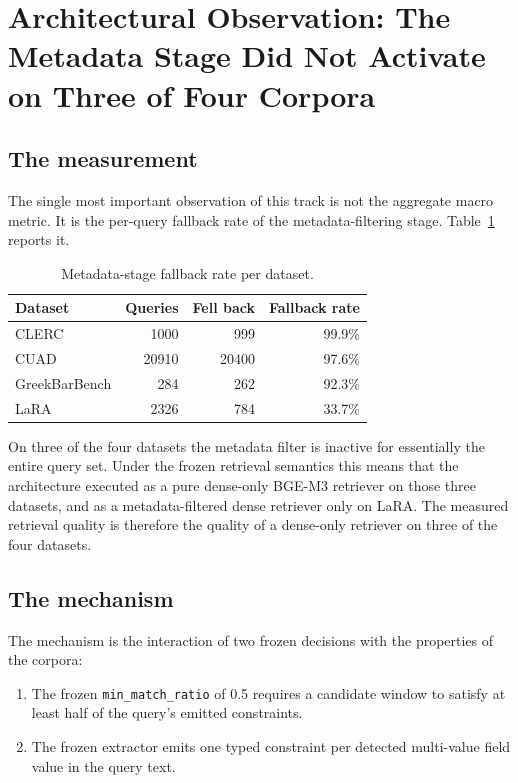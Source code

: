 \documentclass[11pt,a4paper]{article}
\begin{document}
\section{Architectural Observation: The Metadata Stage Did Not
Activate on Three of Four Corpora}\label{sec:observation}

\subsection{The measurement}
The single most important observation of this track is not the
aggregate macro metric. It is the per-query fallback rate of the
metadata-filtering stage. Table~\ref{tab:fallback} reports it.

\begin{table}[h]
\centering
\caption{Metadata-stage fallback rate per dataset.}
\label{tab:fallback}
\small
\begin{tabular}{l r r r}
\toprule
\textbf{Dataset} & \textbf{Queries} & \textbf{Fell back}
  & \textbf{Fallback rate} \\
\midrule
CLERC              & \num{1000}  & \num{999}   & \num{99.9}\% \\
CUAD               & \num{20910} & \num{20400} & \num{97.6}\% \\
GreekBarBench      & \num{284}   & \num{262}   & \num{92.3}\% \\
LaRA               & \num{2326}  & \num{784}   & \num{33.7}\% \\
\bottomrule
\end{tabular}
\end{table}

On three of the four datasets the metadata filter is inactive for
essentially the entire query set. Under the frozen retrieval
semantics this means that the architecture executed as a pure
dense-only BGE-M3 retriever on those three datasets, and as a
metadata-filtered dense retriever only on LaRA. The measured
retrieval quality is therefore the quality of a dense-only retriever
on three of the four datasets.

\subsection{The mechanism}
The mechanism is the interaction of two frozen decisions with the
properties of the corpora:

\begin{enumerate}[leftmargin=1.5em,itemsep=0.15em]
  \item The frozen \texttt{min\_match\_ratio} of \num{0.5} requires
    a candidate window to satisfy at least half of the query's
    emitted constraints.
  \item The frozen extractor emits one typed constraint per detected
    multi-value field value in the query text.
\end{enumerate}
\end{document}
